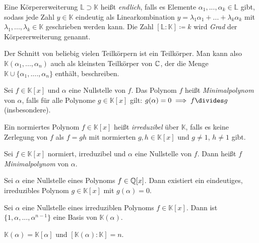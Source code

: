 \documentclass{cheat-sheet}
\newcommand{\K}{\mathbb{K}} %
\renewcommand{\L}{\mathbb{L}} %
\begin{document}
\begin{defn}
  Eine Körpererweiterung $\L \supset \K$ heißt \emph{endlich}, falls es Elemente $\alpha_1, ..., \alpha_k \in \L$ gibt, sodass jede Zahl $y \in \K$ eindeutig als Linearkombination $y = \lambda_1 \alpha_1 + ... + \lambda_k \alpha_k$ mit $\lambda_1, ..., \lambda_k \in \K$ geschrieben werden kann. Die Zahl $[\L : \K] \coloneqq k$ wird \emph{Grad} der Körpererweiterung genannt.
\end{defn}

\begin{bem}
  Der Schnitt von beliebig vielen Teilkörpern ist ein Teilkörper. Man kann also $\K(\alpha_1, ..., \alpha_n)$ auch als kleinsten Teilkörper von $\mathbb{C}$, der die Menge $\K \cup \{ \alpha_1, ...., \alpha_n \}$ enthält, beschreiben.
\end{bem}

\begin{defn}
  Sei $f \in \K[x]$ und $\alpha$ eine Nullstelle von $f$. Das Polynom $f$ heißt \emph{Minimalpolynom} von $\alpha$, falls für alle Polynome $g \in \K[x]$ gilt: $g(\alpha) = 0 \implies f \divides g$ (insbesondere).
\end{defn}

\begin{defn}
  Ein normiertes Polynom $f \in \K[x]$ heißt \emph{irreduzibel} über $\K$, falls es keine Zerlegung von $f$ als $f = gh$ mit normierten $g, h \in \K[x]$ und $g \not= 1$, $h \not= 1$ gibt.
\end{defn}

\begin{defn}
  Sei $f \in \K[x]$ normiert, irreduzibel und $\alpha$ eine Nullstelle von $f$. Dann heißt $f$ \emph{Minimalpolynom} von $\alpha$.
\end{defn}

\begin{bem}
  Sei $\alpha$ eine Nullstelle eines Polynoms $f \in \mathbb{Q}[x]$. Dann existiert ein eindeutiges, irreduzibles Polynom $g \in \K[x]$ mit $g(\alpha) = 0$.
\end{bem}

\begin{satz}
  Sei $\alpha$ eine Nullstelle eines irreduziblen Polynoms $f \in \K[x]$. Dann ist $\{ 1, \alpha, ..., \alpha^{n-1} \}$ eine Basis von $\K(\alpha)$.
\end{satz}

\begin{kor}
  $\K(\alpha) = \K[\alpha]$ und $[\K(\alpha) : \K] = n$.
\end{kor}
\end{document}
